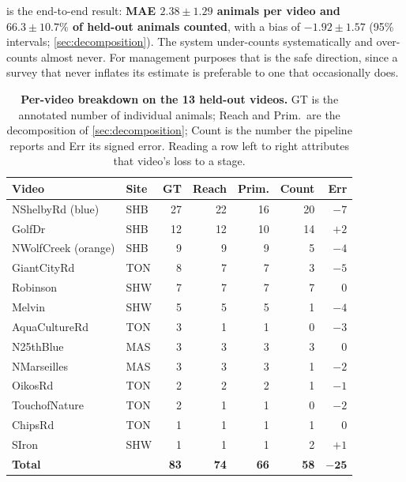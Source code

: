  is the end-to-end result: \textbf{MAE $2.38 \pm 1.29$ animals per video
and $66.3 \pm 10.7\%$ of held-out animals counted}, with a bias of $-1.92 \pm 1.57$ (95\%
intervals; \cref{sec:decomposition}). The system under-counts systematically and
over-counts almost never. For management purposes that is the safe direction, since a
survey that never inflates its estimate is preferable to one that occasionally does.

\begin{table}[htbp]
\caption{\textbf{Per-video breakdown on the 13 held-out videos.} GT is the annotated
number of individual animals; Reach and Prim.\ are the decomposition of
\cref{sec:decomposition}; Count is the number the pipeline reports and Err its signed error.
Reading a row left to right attributes that video's loss to a stage.\label{tab:pervideo}}
\centering
\begin{tabularx}{\textwidth}{llRRRRR}
\toprule
\textbf{Video} & \textbf{Site} & \textbf{GT} & \textbf{Reach} & \textbf{Prim.} & \textbf{Count} & \textbf{Err} \\
\midrule
NShelbyRd (blue) & SHB & 27 & 22 & 16 & 20 & $-7$ \\
GolfDr & SHB & 12 & 12 & 10 & 14 & $+2$ \\
NWolfCreek (orange) & SHB & 9 & 9 & 9 & 5 & $-4$ \\
GiantCityRd & TON & 8 & 7 & 7 & 3 & $-5$ \\
Robinson & SHW & 7 & 7 & 7 & 7 & $0$ \\
Melvin & SHW & 5 & 5 & 5 & 1 & $-4$ \\
AquaCultureRd & TON & 3 & 1 & 1 & 0 & $-3$ \\
N25thBlue & MAS & 3 & 3 & 3 & 3 & $0$ \\
NMarseilles & MAS & 3 & 3 & 3 & 1 & $-2$ \\
OikosRd & TON & 2 & 2 & 2 & 1 & $-1$ \\
TouchofNature & TON & 2 & 1 & 1 & 0 & $-2$ \\
ChipsRd & TON & 1 & 1 & 1 & 1 & $0$ \\
SIron & SHW & 1 & 1 & 1 & 2 & $+1$ \\
\midrule
\textbf{Total} & & \textbf{83} & \textbf{74} & \textbf{66} & \textbf{58} & $\mathbf{-25}$ \\
\bottomrule
\end{tabularx}
\end{table}

